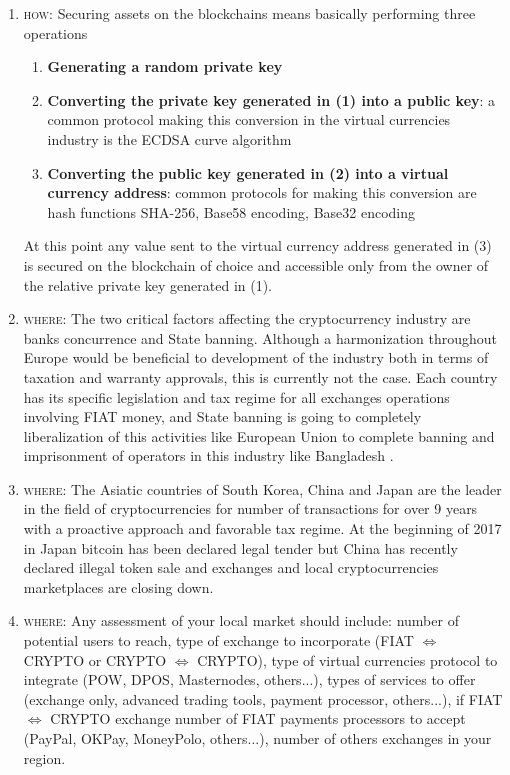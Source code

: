 \documentclass[11pt,fleqn,oneside]{book} %
\begin{document}
\begin{enumerate}
	\item \textsc{how}: Securing assets on the blockchains means basically performing three operations
		\begin{enumerate}[label*=\arabic*.]
			\item \textbf{Generating a random private key}
			\item \textbf{Converting the private key generated in (1) into a public key}: a common protocol making this conversion
			in the virtual currencies industry is the ECDSA curve algorithm
			\item \textbf{Converting the public key generated in (2) into a virtual currency address}: common protocols for making this conversion
			are hash functions SHA-256, Base58 encoding, Base32 encoding
		\end{enumerate}
	At this point any value sent to the virtual currency address generated in (3) is secured on the blockchain of choice and accessible
	only from the owner of the relative private key generated in (1).
	\item \textsc{where}: The two critical factors affecting the cryptocurrency industry are banks concurrence and State banning.
	Although a harmonization throughout Europe would be beneficial to development of the industry both in terms of 
	taxation and warranty approvals, this is currently not the case. Each country has its specific legislation and tax
	regime for all exchanges operations involving FIAT money, and State banning is going to completely liberalization 
	of this activities like European Union to complete banning and imprisonment of operators in this industry like Bangladesh
	\cite{bitcoinLegality}. 

	\item \textsc{where}: The Asiatic countries of South Korea, China and Japan are the leader in the field of cryptocurrencies for number of 
	transactions for over 9 years with a proactive approach and favorable tax regime. At the beginning of 2017 in Japan bitcoin
	has been declared legal tender but China has recently declared illegal token sale and exchanges and local cryptocurrencies
	marketplaces are closing down.
	\item \textsc{where}: Any assessment of your local market should include: number of potential users to reach, 
	type of exchange to incorporate (FIAT $\Leftrightarrow$ CRYPTO or CRYPTO $\Leftrightarrow$ CRYPTO), type of virtual currencies protocol 
	to integrate (POW, DPOS, Masternodes, others...), types of services to offer (exchange only, advanced trading tools,
	payment processor, others...), if FIAT $\Leftrightarrow$ CRYPTO exchange number of FIAT payments processors to accept (PayPal, OKPay,
	MoneyPolo, others...), number of others exchanges in your region.


\end{enumerate}
\end{document}
